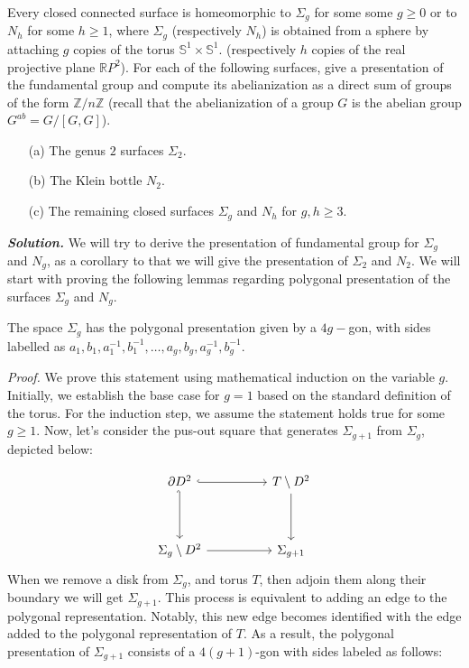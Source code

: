 \documentclass[11pt]{article}
\newcommand{\bb}[1]{\mathbb{#1}}
\newcommand{\Z}{\bb{Z}}
\newcommand{\R}{\mathbb{R}}
\newcommand{\s}{\bb{S}}
\newcommand{\p}{\partial}
\newcommand{\sol}{ \textbf{\textit{Solution.}} }
\begin{document}
 \begin{prob}{}{}
    Every closed connected surface is homeomorphic to $\Sigma_g$ for some some $g \geq 0$ or to $N_h$ for some $h \geq 1$, where $\Sigma_g$ (respectively $N_h$) is obtained from a sphere by attaching $g$ copies of the torus $\s^1 \times \s^1$. (respectively $h$ copies of the real projective plane $\R P^2$). For each of the following surfaces, give a presentation of the fundamental group and compute its abelianization as a direct sum of groups of the form $\Z/n\Z$ (recall that the abelianization of a group $G$ is the abelian group $G^{ab} = G/[G,G]$). 
\begin{enumerate}
    \item[(a)] The genus $2$ surfaces $\Sigma_2$. 
    \item[(b)] The Klein bottle $N_2$. 
    \item[(c)] The remaining closed surfaces $\Sigma_g$ and $N_h$ for $g,h \geq 3$.   
\end{enumerate}
 \end{prob}

 \sol We will try to derive the presentation of fundamental group for $\Sigma_g$ and $N_g$, as a corollary to that we will give the presentation of $\Sigma_2$ and $N_2$. We will start with proving the following lemmas regarding polygonal presentation of the surfaces $\Sigma_g$ and $N_g$. 

 \begin{Lemn}{ }{}
    The space \( \Sigma_g \) has the polygonal presentation given by a \( 4g- \)gon, with sides labelled as \( a_1,b_1,a_1^{-1}, b_1^{-1}, \dots, a_g,b_g,a_g^{-1}, b_g^{-1} \). 
 \end{Lemn}\label{lem:1}

 \noindent \textit{Proof.} We prove this statement using mathematical induction on the variable \( g \). Initially, we establish the base case for \( g = 1 \) based on the standard definition of the torus. For the induction step, we assume the statement holds true for some \( g \geq 1 \). Now, let's consider the pus-out square that generates \( \Sigma_{g+1} \) from \( \Sigma_g \), depicted below:
  
 \[\begin{tikzcd}
    {\p D^2} && T\setminus D^2 \\
    \\
    {\Sigma_g\setminus D^2} && {\Sigma_{g+1}}
    \arrow[hook, from=1-1, to=1-3]
    \arrow[hook', from=1-1, to=3-1]
    \arrow[from=3-1, to=3-3]
    \arrow[from=1-3, to=3-3]
  \end{tikzcd}\]
 When we remove a disk from \( \Sigma_g \), and torus $T$, then adjoin them along their boundary we will get $\Sigma_{g+1}$. This process is equivalent to adding an edge to the polygonal representation. Notably, this new edge becomes identified with the edge added to the polygonal representation of \( T \). As a result, the polygonal presentation of \( \Sigma_{g+1} \) consists of a \( 4(g+1) \)-gon with sides labeled as follows:
 
\end{document}
